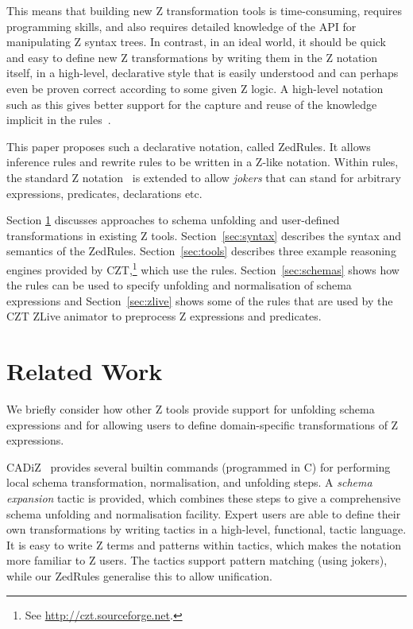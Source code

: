 \documentclass{entcs}
\begin{document}
This means that building new Z transformation tools is time-consuming,
requires programming skills, and also requires detailed knowledge of the
API for manipulating Z syntax trees.  In contrast, in an ideal world, it
should be quick and easy to define new Z transformations by writing them in
the Z notation itself, in a high-level, declarative style that is easily
understood and can perhaps even be proven correct according to some given Z
logic.  A high-level notation such as this gives better support for the
capture and reuse of the knowledge implicit in the
rules~\cite{armour:business-model00}.

This paper proposes such a declarative notation, called ZedRules.  It
allows inference rules and rewrite rules to be written in a Z-like
notation.  Within rules, the standard Z notation~\cite{ISOZ} is extended to
allow \emph{jokers} that can stand for arbitrary expressions, predicates,
declarations etc.

Section \ref{sec:relwork} discusses approaches to schema unfolding and
user-defined transformations in existing Z tools.
Section~\ref{sec:syntax} describes the syntax and semantics of the
ZedRules.  Section~\ref{sec:tools} describes three example reasoning
engines provided by CZT,\footnote{See
\url{http://czt.sourceforge.net}.} which use the rules.
Section~\ref{sec:schemas} shows how the rules can be used to specify
unfolding and normalisation of schema expressions and
Section~\ref{sec:zlive} shows some of the rules that are used by the
CZT ZLive animator to preprocess Z expressions and predicates.


\section{Related Work} \label{sec:relwork}

We briefly consider how other Z tools provide support for unfolding
schema expressions and for allowing users to define domain-specific
transformations of Z expressions.

CADiZ~\cite{cadiz:refman02} provides several builtin commands (programmed
in C) for performing local schema transformation, normalisation, and
unfolding steps.  A \emph{schema expansion} tactic is provided, which
combines these steps to give a comprehensive schema unfolding and
normalisation facility.  Expert users are able to define their own
transformations by writing tactics in a high-level, functional, tactic
language.  It is easy to write Z terms and patterns within tactics, which
makes the notation more familiar to Z users.  The tactics support pattern
matching (using jokers), while our ZedRules generalise this to allow
unification.
\end{document}
